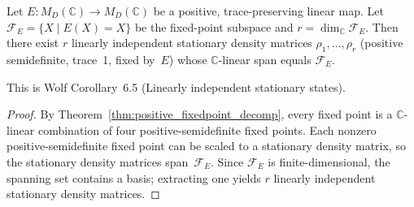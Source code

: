 \begin{corollary}\label{cor:stationary_density_span}
    \leanok
    Let $E\colon M_D(\mathbb C)\to M_D(\mathbb C)$ be a positive,
    trace-preserving linear map.  Let $\mathcal F_E=\{X\mid E(X)=X\}$ be the
    fixed-point subspace and $r = \dim_{\mathbb C} \mathcal F_E$.
    Then there exist $r$ linearly independent stationary density matrices
    $\rho_1,\dots,\rho_r$ (positive semidefinite, trace~1, fixed by~$E$)
    whose $\mathbb C$-linear span equals $\mathcal F_E$.

    This is Wolf Corollary~6.5 (Linearly independent stationary states).
\end{corollary}

\begin{proof}\leanok
    By Theorem~\ref{thm:positive_fixedpoint_decomp}, every fixed point is a
    $\mathbb C$-linear combination of four positive-semidefinite fixed points.
    Each nonzero positive-semidefinite fixed point can be scaled to a stationary
    density matrix, so the stationary density matrices span~$\mathcal F_E$.
    Since $\mathcal F_E$ is finite-dimensional, the spanning set contains a
    basis; extracting one yields $r$ linearly independent stationary density
    matrices.
\end{proof}
